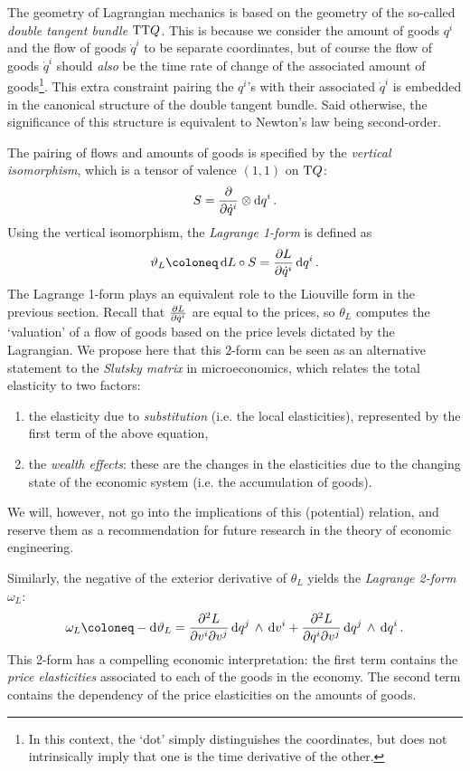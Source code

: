 The geometry of Lagrangian mechanics is based on the geometry of the so-called \emph{double tangent bundle} $\mathrm{T}\mathrm{T}Q$. This is because we consider the amount of goods $q^i$ and the flow of goods $\dot{q}^i$ to be separate coordinates, but of course the flow of goods $\dot{q}^i$ should \emph{also} be the time rate of change of the associated amount of goods\footnote{In this context, the `dot' simply distinguishes the coordinates, but does not intrinsically imply that one is the time derivative of the other.}. This extra constraint pairing the $q^i$'s with their associated $\dot{q}^i$ is embedded in the canonical structure of the double tangent bundle. Said otherwise, the significance of this structure is equivalent to Newton's law being second-order.

The pairing of flows and amounts of goods is specified by the \emph{vertical isomorphism}, which is a tensor of valence $(1,1)$ on $\mathrm{T}Q$: \cite{Carinena1990}
\begin{equation}
    S = \pdv{}{\dot{q}^i}\otimes \dd{q^i}.
\end{equation}
Using the vertical isomorphism, the \emph{Lagrange 1-form} is defined as
\begin{equation}
    \theta_L \coloneq \dd{L}\circ S = \pdv{L}{\dot{q}^i}\dd{q^i}.
\end{equation}
The Lagrange 1-form plays an equivalent role to the Liouville form in the previous section. Recall that $\pdv{L}{\dot{q}^i}$ are equal to the prices, so $\theta_L$ computes the `valuation' of a flow of goods based on the price levels dictated by the Lagrangian. We propose here that this 2-form can be seen as an alternative statement to the \emph{Slutsky matrix} in microeconomics, which relates the total elasticity to two factors: \cite{varianhalr1992}
\begin{enumerate}[label=(\roman*), noitemsep]
    \item the elasticity due to \emph{substitution} (i.e. the local elasticities), represented by the first term of the above equation, 
    \item the \emph{wealth effects}: these are the changes in the elasticities due to the changing state of the economic system (i.e. the accumulation of goods).
\end{enumerate}
We will, however, not go into the implications of this (potential) relation, and reserve them as a recommendation for future research in the theory of economic engineering.

Similarly, the negative of the exterior derivative of $\theta_L$ yields the \emph{Lagrange 2-form} $\omega_L$:
\begin{equation}
    \omega_L \coloneq -\dd{\theta_L} = \pdv[2]{L}{v^i}{v^j}\wedgep{\dd{q^j}}{\dd{v^i}} + \pdv[2]{L}{q^i}{v^j}\wedgep{\dd{q^j}}{\dd{q^i}}.
\end{equation}
This 2-form has a compelling economic interpretation: the first term contains the \emph{price elasticities} associated to each of the goods in the economy. The second term contains the dependency of the price elasticities on the amounts of goods.

